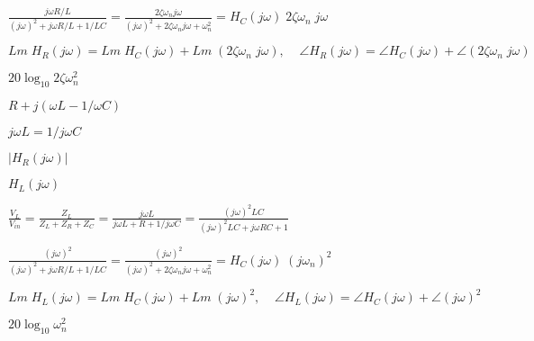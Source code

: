 \documentclass{article}
\def\lthtmlcheckvsize{\ifdim\ht\sizebox<\vsize 
  \ifdim\wd\sizebox<\hsize\expandafter\hfill\fi \expandafter\vfill
  \else\expandafter\vss\fi}%
\begin{document}
{\newpage\clearpage
{}%
$\displaystyle \frac{j\omega R/L}{(j\omega)^2 +j\omega R/L+1/LC}
=\frac{2\zeta\omega_nj\omega}{(j\omega)^2 +2\zeta\omega_n j\omega+\omega^2_n}
=H_C(j\omega) \;2\zeta \omega_n\;j \omega$%
\lthtmlindisplaymathZ
\lthtmlcheckvsize\clearpage}

{\newpage\clearpage
{}%
$\displaystyle Lm\;H_R(j\omega)=Lm\; H_C(j\omega)+Lm\;(2\zeta\omega_n\;j\omega),\;\;\;\;
\angle H_R(j\omega)=\angle H_C(j\omega)+\angle(2\zeta\omega_n\;j\omega)$%
\lthtmlindisplaymathZ
\lthtmlcheckvsize\clearpage}

{\newpage\clearpage
{}%
$ 20\log_{10} 2\zeta\omega_n^2$%
\lthtmlindisplaymathZ
\lthtmlcheckvsize\clearpage}

{\newpage\clearpage
{}%
$ R+j(\omega L-1/\omega C)$%
\lthtmlindisplaymathZ
\lthtmlcheckvsize\clearpage}

{\newpage\clearpage
{}%
$ j\omega L=1/j\omega C$%
\lthtmlindisplaymathZ
\lthtmlcheckvsize\clearpage}

{\newpage\clearpage
{}%
$ |H_R(j\omega)|$%
\lthtmlindisplaymathZ
\lthtmlcheckvsize\clearpage}

{\newpage\clearpage
{}%
$\displaystyle H_L(j\omega)$%
\lthtmlindisplaymathZ
\lthtmlcheckvsize\clearpage}

{\newpage\clearpage
{}%
$\displaystyle \frac{V_L}{V_{in}}=\frac{Z_L}{Z_L+Z_R+Z_C}
=\frac{j\omega L}{j\omega L+R+1/j\omega C}
=\frac{(j\omega)^2 LC}{(j\omega)^2 LC+j\omega RC+1}$%
\lthtmlindisplaymathZ
\lthtmlcheckvsize\clearpage}

{\newpage\clearpage
{}%
$\displaystyle \frac{(j\omega)^2}{(j\omega)^2 +j\omega R/L+1/LC}
=\frac{(j\omega)^2}{(j\omega)^2 +2\zeta\omega_n j\omega+\omega^2_n}
=H_C(j\omega) \;(j\omega_n)^2$%
\lthtmlindisplaymathZ
\lthtmlcheckvsize\clearpage}

{\newpage\clearpage
{}%
$\displaystyle Lm\;H_L(j\omega)=Lm\; H_C(j\omega)+Lm\;(j\omega)^2,\;\;\;\;
\angle H_L(j\omega)=\angle H_C(j\omega)+\angle (j\omega)^2$%
\lthtmlindisplaymathZ
\lthtmlcheckvsize\clearpage}

{\newpage\clearpage
{}%
$ 20\log_{10} \omega_n^2$%
\lthtmlindisplaymathZ
\lthtmlcheckvsize\clearpage}
\end{document}
